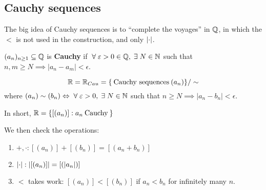 \subsection{Cauchy sequences}
The big idea of Cauchy sequences is to ``complete the voyages'' in $\mathbb{Q}$, in which the $<$ is not used in the construction, and only $\lvert\cdot\rvert$.

\begin{definition} 
    $(a_n)_{n \geq 1} \subseteq \mathbb{Q}$ is \textbf{Cauchy} if $\forall \epsilon > 0 \in \bbq, \exists N \in \bbn $ such that $n, m \geq N \implies |a_n - a_m| < \epsilon$.
\end{definition}
\begin{definition} 
\[\mathbb{R} = \mathbb{R}_{Cau} = \{\:\text{Cauchy sequences}\:  (a_n)\}/\sim\]
where $(a_n) \sim (b_n) \Leftrightarrow \forall \epsilon > 0, \exists N \in \bbn$ such that $n \geq N \implies |a_n - b_n| < \epsilon$.

In short, $\mathbb{R} = \{[(a_n)] : a_n \:\text{Cauchy}\: \}$
\end{definition}
\begin{properties}
We then check the operations:
\begin{enumerate}
    \item $+, \cdot: [(a_n)] + [(b_n)] = [(a_n + b_n)]$
    \item $\lvert\cdot\rvert: \lvert[(a_n)]\rvert = [(\lvert a_n\rvert)]$
    \item $<$ takes work: $[(a_n)] < [(b_n)]$ if $a_n < b_n$ for infinitely many $n$.
\end{enumerate}
\end{properties}
